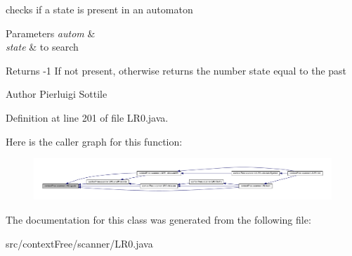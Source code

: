 checks if a state is present in an automaton 


\begin{DoxyParams}{Parameters}
{\em autom} & \\
\hline
{\em state} & to search \\
\hline
\end{DoxyParams}
\begin{DoxyReturn}{Returns}
-\/1 If not present, otherwise returns the number state equal to the past 
\end{DoxyReturn}
\begin{DoxyAuthor}{Author}
Pierluigi Sottile 
\end{DoxyAuthor}


Definition at line 201 of file L\-R0.\-java.



Here is the caller graph for this function\-:\nopagebreak
\begin{figure}[H]
\begin{center}
\leavevmode
\includegraphics[width=350pt]{classcontext_free_1_1scanner_1_1_l_r0_ace66d28273502a9daf8e4550f48b5782_icgraph}
\end{center}
\end{figure}




The documentation for this class was generated from the following file\-:\begin{DoxyCompactItemize}
\item 
src/context\-Free/scanner/L\-R0.\-java\end{DoxyCompactItemize}

